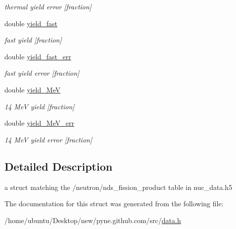 \begin{DoxyCompactItemize}
\begin{DoxyCompactList}\small\item\em thermal yield error \mbox{[}fraction\mbox{]} \end{DoxyCompactList}\item 
double \hyperlink{structpyne_1_1ndsfpy_ae890b10d182d771d0837b24818040a25}{yield\+\_\+fast}\hypertarget{structpyne_1_1ndsfpy_ae890b10d182d771d0837b24818040a25}{}\label{structpyne_1_1ndsfpy_ae890b10d182d771d0837b24818040a25}

\begin{DoxyCompactList}\small\item\em fast yield \mbox{[}fraction\mbox{]} \end{DoxyCompactList}\item 
double \hyperlink{structpyne_1_1ndsfpy_a0e2478bc6cbf2317861727a88cb8370b}{yield\+\_\+fast\+\_\+err}\hypertarget{structpyne_1_1ndsfpy_a0e2478bc6cbf2317861727a88cb8370b}{}\label{structpyne_1_1ndsfpy_a0e2478bc6cbf2317861727a88cb8370b}

\begin{DoxyCompactList}\small\item\em fast yield error \mbox{[}fraction\mbox{]} \end{DoxyCompactList}\item 
double \hyperlink{structpyne_1_1ndsfpy_a5e67e99b97b5ca511ca39c6dcd4b186e}{yield\+\_\+MeV}\hypertarget{structpyne_1_1ndsfpy_a5e67e99b97b5ca511ca39c6dcd4b186e}{}\label{structpyne_1_1ndsfpy_a5e67e99b97b5ca511ca39c6dcd4b186e}

\begin{DoxyCompactList}\small\item\em 14 MeV yield \mbox{[}fraction\mbox{]} \end{DoxyCompactList}\item 
double \hyperlink{structpyne_1_1ndsfpy_a1d24f4162fe242108b8032f76171d7e5}{yield\+\_\+Me\+V\+\_\+err}\hypertarget{structpyne_1_1ndsfpy_a1d24f4162fe242108b8032f76171d7e5}{}\label{structpyne_1_1ndsfpy_a1d24f4162fe242108b8032f76171d7e5}

\begin{DoxyCompactList}\small\item\em 14 MeV yield error \mbox{[}fraction\mbox{]} \end{DoxyCompactList}\end{DoxyCompactItemize}


\subsection{Detailed Description}
a struct matching the \textquotesingle{}/neutron/nds\+\_\+fission\+\_\+product\textquotesingle{} table in nuc\+\_\+data.\+h5 

The documentation for this struct was generated from the following file\+:\begin{DoxyCompactItemize}
\item 
/home/ubuntu/\+Desktop/new/pyne.\+github.\+com/src/\hyperlink{data_8h}{data.\+h}\end{DoxyCompactItemize}
